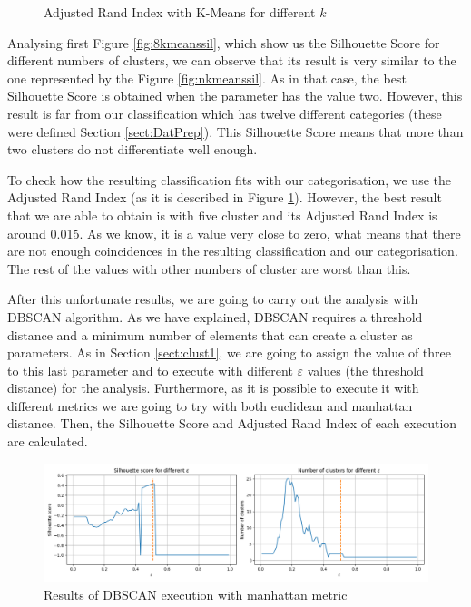 \begin{figure}
\begin{minipage}[b]{0.4\paperwidth}
		\caption{Adjusted Rand Index with K-Means for different $k$}%
		\label{fig:8kmeansari}
	\end{minipage}
\end{figure}

Analysing first Figure \ref{fig:8kmeanssil}, which show us the Silhouette Score for different numbers of clusters, we can observe that its result is very similar to the one represented by the Figure \ref{fig:nkmeanssil}. As in that case, the best Silhouette Score is obtained when the parameter has the value two. However, this result is far from our classification which has twelve different categories (these were defined Section \ref{sect:DatPrep}). This Silhouette Score means that more than two clusters do not differentiate well enough.

To check how the resulting classification fits with our categorisation, we use the Adjusted Rand Index (as it is described in Figure \ref{fig:8kmeansari}). However, the best result that we are able to obtain is with five cluster and its Adjusted Rand Index is around 0.015. As we know, it is a value very close to zero, what means that there are not enough coincidences in the resulting classification and our categorisation. The rest of the values with other numbers of cluster are worst than this.

After this unfortunate results, we are going to carry out the analysis with DBSCAN algorithm. As we have explained, DBSCAN requires a threshold distance and a minimum number of elements that can create a cluster as parameters. As in Section \ref{sect:clust1}, we are going to assign the value of three to this last parameter and to execute with different $\varepsilon$ values (the threshold distance) for the analysis. Furthermore, as it is possible to execute it with different metrics we are going to try with both euclidean and manhattan distance. Then, the Silhouette Score and Adjusted Rand Index of each execution are calculated.

\begin{figure}
	\centering%
	\centerline{\includegraphics[width=\textwidth]{Imagenes/Bitmap/Clustering/dbscan8sil.png}}%
	\caption{Results of DBSCAN execution with manhattan metric}%
	\label{fig:dbscanman}
\end{figure}

